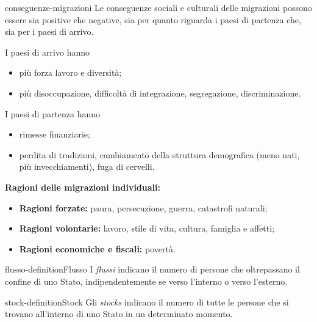 \documentclass[preview]{standalone}
\begin{document}
\begin{snippet}{conseguenze-migrazioni}
    Le conseguenze sociali e culturali delle migrazioni
    possono essere sia positive che negative, sia per quanto
    riguarda i paesi di partenza che, sia per i paesi di arrivo.
    
    I paesi di arrivo hanno
    \begin{itemize}
        \item \greenbox più forza lavoro e diversità;
        \item \redbox più disoccupazione, difficoltà di integrazione,
        segregazione, discriminazione.
    \end{itemize}
    
    I paesi di partenza hanno
    \begin{itemize}
        \item \greenbox rimesse finanziarie;
        \item \redbox perdita di tradizioni,
        cambiamento della struttura demografica (meno nati, più invecchiamenti),
        fuga di cervelli.
    \end{itemize}

    \textbf{Ragioni delle migrazioni individuali:}
    \begin{itemize}
        \item \textbf{Ragioni forzate:} paura, persecuzione, guerra, catastrofi naturali;
        \item \textbf{Ragioni volontarie:} lavoro, stile di vita, cultura, famiglia e affetti;
        \item \textbf{Ragioni economiche e fiscali:} povertà.
    \end{itemize}
\end{snippet}

\begin{snippetdefinition}{flusso-definition}{Flusso}
    I \textit{flussi} indicano il numero di persone che oltrepassano il confine di uno
    Stato, indipendentemente se verso l'interno o verso l'esterno.
\end{snippetdefinition}


\begin{snippetdefinition}{stock-definition}{Stock}
    Gli \textit{stocks} indicano il numero di tutte le persone che si trovano all'interno di uno Stato in un
    determinato momento.
\end{snippetdefinition}

\end{document}
